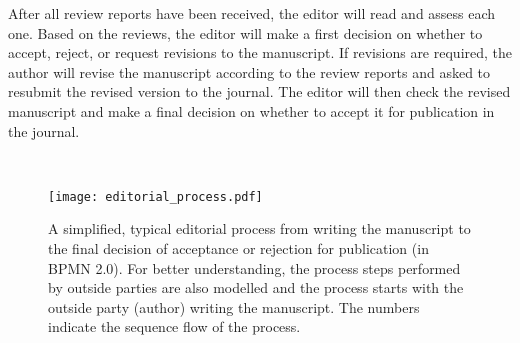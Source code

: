 After all review reports have been received, the editor will read and assess each one. Based on the reviews, the editor will make a first
decision on whether to accept, reject, or request revisions to the manuscript. If revisions are required, the author will revise the manuscript
according to the review reports and asked to resubmit the revised version to the journal. The editor will then check the revised manuscript
and make a final decision on whether to accept it for publication in the journal.

\begin{landscape}
    ~
    \vspace{3cm}
    \begin{figure*}[h!]
        \centering
        \caption{A simplified, typical editorial process from writing the manuscript to the final decision of acceptance or
        rejection for publication (in BPMN 2.0). For better understanding, the process steps performed by outside parties 
        are also modelled and the process starts with the outside party (author) writing the manuscript. The numbers
        indicate the sequence flow of the process.\\~}
        \label{fig:bpmnEditorialProcess}
        \texttt{[image: editorial\_process.pdf]}
    \end{figure*}
\end{landscape}


